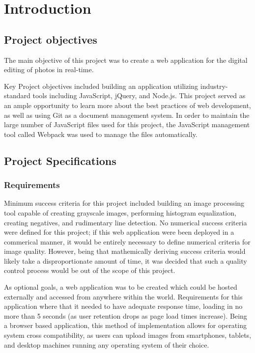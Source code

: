 \documentclass{article}
\let\Oldsection\section
\renewcommand{\section}{\FloatBarrier\Oldsection}
\let\Oldsubsection\subsection
\renewcommand{\subsection}{\FloatBarrier\Oldsubsection}
\let\Oldsubsubsection\subsubsection
\renewcommand{\subsubsection}{\FloatBarrier\Oldsubsubsection}
\begin{document}
  \newpage

  \section{Introduction}

  \subsection{Project objectives}

  The main objective of this project was to create a web application for the digital editing of photos in real-time.

  Key Project objectives included building an application utilizing industry-standard tools including JavaScript, jQuery, and Node.js. This project served as an ample opportunity to learn more about the best practices of web development, as well as using Git as a document management system. In order to maintain the large number of JavaScript files used for this project, the JavaScript management tool called Webpack was used to manage the files automatically.

  \subsection{Project Specifications}

  \subsubsection{Requirements}

  Minimum success criteria for this project included building an image processing tool capable of creating grayscale images, performing histogram equalization, creating negatives, and rudimentary line detection. No numerical success criteria were defined for this project; if this web application were been deployed in a commerical manner, it would be entirely necessary to define numerical criteria for image quality. However, being that mathemically deriving success criteria would likely take a disproportionate amount of time, it was decided that such a quality control process would be out of the scope of this project.
  
  As optional goals, a web application was to be created which could be hosted externally and accessed from anywhere within the world. Requirements for this application where that it needed to have adequate response time, loading in no more than 5 seconds (as user retention drops as page load times increase). Being a browser based application, this method of implementation allows for operating system cross compatibility, as users can upload images from smartphones, tablets, and desktop machines running any operating system of their choice.
  
\end{document}
